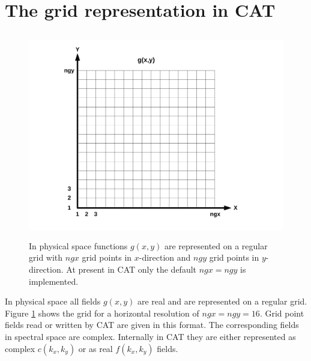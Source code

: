 \section{The grid representation in CAT}
\label{sec_grids}
%
\begin{figure}
   \includegraphics[height=9cm]{figures/phys_grid.pdf}
   \caption{In physical space functions $g(x,y)$ are represented on a
            regular grid with $ngx$ grid points in $x$-direction and
            $ngy$ grid points in $y$-direction. At present in CAT only
            the default $ngx = ngy$ is implemented.}
   \label{fig_physgrid}
\end{figure}
In physical space all fields $g(x,y)$ are real and are represented on 
a regular grid. Figure \ref{fig_physgrid} shows the grid for a horizontal
resolution of $ngx = ngy = 16$. Grid point fields read or written by CAT
are given in this format. The corresponding fields in spectral space are 
complex. Internally in CAT they are either represented as complex 
$c(k_{x},k_{y})$ or as real $f(k_{x},k_{y})$ fields.
